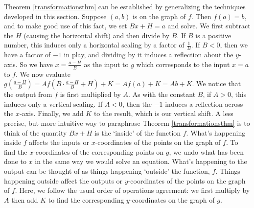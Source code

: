 Theorem \ref{transformationsthm} can be established by generalizing the techniques developed in this section.  Suppose $(a,b)$ is on the graph of $f$. Then $f(a) = b$, and to make good use of this fact, we set $Bx+H = a$ and solve.  We first subtract the $H$ (causing the horizontal shift) and then divide by $B$.  If $B$ is a positive number, this induces only a horizontal scaling by a factor of $\frac{1}{B}$.  If  $B<0$, then we have a factor of $-1$ in play, and dividing by it induces a reflection about the $y$-axis.  So we have $x = \frac{a-H}{B}$ as the input to $g$ which corresponds to the input $x=a$ to $f$.  We now evaluate $g\left( \frac{a-H}{B}\right) = A f\left(B \cdot \frac{a-H}{B} + H\right) + K = A f(a)+K = A b + K$.  We notice that the output from $f$ is first multiplied by $A$.  As with the constant $B$, if $A > 0$, this induces only a vertical scaling.  If $A < 0$, then the $-1$ induces a reflection across the $x$-axis.  Finally, we add $K$ to the result, which is our vertical shift.  A less precise, but more intuitive way to paraphrase Theorem \ref{transformationsthm} is to think of the quantity $Bx+H$ is the `inside' of the function $f$.  What's happening inside $f$ affects the inputs or $x$-coordinates of the points on the graph of $f$.  To find the $x$-coordinates of the corresponding points on $g$, we undo what has been done to $x$ in the same way we would solve an equation.  What's happening to the output can be thought of as things happening `outside' the function, $f$.  Things happening outside affect the outputs or $y$-coordinates of the points on the graph of $f$.  Here, we follow the usual order of operations agreement: we first multiply by $A$ then add $K$ to find the corresponding $y$-coordinates on the graph of $g$.

